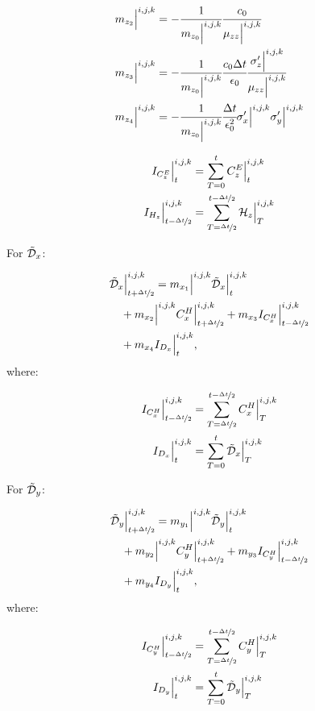 \begin{align}
    m_{{z_2}}\Big|^{i,j,k} &= -\cfrac{1}{m_{{z_0}}\Big|^{i,j,k}} \cfrac{c_0}{\mu_{zz}\Big|^{i,j,k}}
    \\
    m_{{z_3}}\Big|^{i,j,k} &= -\cfrac{1}{m_{{z_0}}\Big|^{i,j,k}} \cfrac{c_0\Delta t}{\epsilon_0 }\cfrac{ \sigma_z^{\prime}\Big|^{i,j,k}}{\mu_{zz}\Big|^{i,j,k}}
    \\
    m_{{z_4}}\Big|^{i,j,k} &= -\cfrac{1}{m_{{z_0}}\Big|^{i,j,k}} \cfrac{\Delta t}{\epsilon_0^2} \sigma_x^{\prime}\Big|^{i,j,k}  \sigma_y^{\prime}\Big|^{i,j,k}
\end{align}

\begin{align}
    I_{C^E_z}\Big|^{i,j,k}_t &= \sum\limits_{T=0}^tC_z^E\Big|^{i,j,k}_t
    \\
    I_{H_z}\Big|^{i,j,k}_{t-\nicefrac{\Delta t}{2}} &= \sum\limits_{T=\nicefrac{\Delta t}{2}}^{t-\nicefrac{\Delta t}{2}} \mathcal{H}_z\Big|^{i,j,k}_T
\end{align}

For $\tilde{\mathcal{D}}_x$:

\begin{align}
    &\tilde{\mathcal{D}}_x\Big|_{t+\nicefrac{\Delta t}{2}}^{i,j,k} = m_{{x_1}}\Big|^{i,j,k} \tilde{\mathcal{D}}_x\Big|_{t}^{i,j,k} 
    \nonumber \\
    & \quad + m_{{x_2}}\Big|^{i,j,k}C_x^H\Big|^{i,j,k}_{t+\nicefrac{\Delta t}{2}} + m_{{x_3}} I_{C^H_x}\Big|^{i,j,k}_{t-\nicefrac{\Delta t}{2}} 
    \nonumber \\
    & \quad + m_{{x_4}} I_{D_x}\Big|^{i,j,k}_{t},
\end{align}
where:

\begin{align}
    I_{C^H_x}\Big|^{i,j,k}_{t-\nicefrac{\Delta t}{2}} &= \sum\limits_{T=\nicefrac{\Delta t}{2}}^{t-\nicefrac{\Delta t}{2}}C_x^H\Big|^{i,j,k}_T
    \\
    I_{D_x}\Big|^{i,j,k}_{t} &= \sum\limits_{T=0}^{t} \tilde{\mathcal{D}}_x\Big|^{i,j,k}_T
\end{align}


For $\tilde{\mathcal{D}}_y$:

\begin{align}
    &\tilde{\mathcal{D}}_y\Big|_{t+\nicefrac{\Delta t}{2}}^{i,j,k} = m_{{y_1}}\Big|^{i,j,k} \tilde{\mathcal{D}}_y\Big|_{t}^{i,j,k} 
    \nonumber \\
    & \quad + m_{{y_2}}\Big|^{i,j,k}C_y^H\Big|^{i,j,k}_{t+\nicefrac{\Delta t}{2}} + m_{{y_3}} I_{C^H_y}\Big|^{i,j,k}_{t-\nicefrac{\Delta t}{2}} 
    \nonumber \\
    & \quad + m_{{y_4}} I_{D_y}\Big|^{i,j,k}_{t},
\end{align}
where:

\begin{align}
    I_{C^H_y}\Big|^{i,j,k}_{t-\nicefrac{\Delta t}{2}} &= \sum\limits_{T=\nicefrac{\Delta t}{2}}^{t-\nicefrac{\Delta t}{2}}C_y^H\Big|^{i,j,k}_T
    \\
    I_{D_y}\Big|^{i,j,k}_{t} &= \sum\limits_{T=0}^{t} \tilde{\mathcal{D}}_y\Big|^{i,j,k}_T
\end{align}


